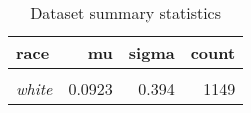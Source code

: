 \begin{table}

\caption{\label{tab:dataset_summary}Dataset summary statistics}
\centering
\begin{tabular}[t]{>{}lrrr}
\toprule
race & mu & sigma & count\\
\midrule
\em{\cellcolor{gray!6}{black}} & \cellcolor{gray!6}{0.5220} & \cellcolor{gray!6}{1.072} & \cellcolor{gray!6}{159}\\
\em{white} & 0.0923 & 0.394 & 1149\\
\bottomrule
\end{tabular}
\end{table}
